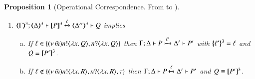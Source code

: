 \documentclass[preprint,11pt]{elsarticle}
\newtheorem{proposition}{Proposition}[section]
\begin{document}
{{\begin{proposition}[Operational Correspondence. From \HOpp to \HOp]
\begin{enumerate}
\begin{enumerate}[a)]
%
%

				\item	If $\ell \notin \set{\news{\tilde{m}} \bactout{n}{\abs{x}{Q}}, \bactinp{n}{\abs{x}{Q}}, \tau}$ then
					$\horel{\tmap{\Gamma}{3}}{\tmap{\Delta}{3}}{\pmap{P}{3}}{\hby{\ell}}
					{\tmap{\Delta'}{3}}{\pmap{P'}{3}}$.

				\item	If $\ell = \btau$ then
					$\horel{\tmap{\Gamma}{3}}{\tmap{\Delta}{3}}{\pmap{P}{3}}{\hby{\tau}}
					{\Delta''}{R}$ and
					$\horel{\tmap{\Gamma}{3}}{\tmap{\Delta'}{3}}{\pmap{P'}{3}}{\hwb}{\Delta''}{R}$, for some $R$.

				\item	If $\ell = \tau$ and $\ell \not= \btau$ then %
					$\horel{\tmap{\Gamma}{3}}{\tmap{\Delta}{3}}{\pmap{P}{3}}{\hby{\tau}}
					{\tmap{\Delta'}{3}}{\pmap{P'}{3}}$.
			\end{enumerate}

		\item	%
			$\horel{\tmap{\Gamma}{3}}{\tmap{\Delta}{3}}{\pmap{P}{3}}{\hby{\ell}}
			{\tmap{\Delta''}{3}}{Q}$ implies
%
			\begin{enumerate}[a)]
				\item	If $\ell \in \{(\nu\, \tilde{m}) n ! \langle \lambda x.\,Q \rangle, n ? \langle \lambda x.\,Q \rangle\}$
					then
					$\Gamma; \Delta \vdash P \xmapsto{\ell'} \Delta' \vdash P'$
					with $\{\!\!\{\ell'\}\!\!\}^{3} = \ell$ and $Q \equiv [\!\![P']\!\!]^3$.

				\item	If $\ell \notin \{(\nu\, \tilde{m}) n ! \langle \lambda x.\,R \rangle, n ? \langle \lambda x.\,R \rangle, \tau\}$
					then
					$\Gamma; \Delta \vdash P \xmapsto{\ell} \Delta' \vdash P'$ and $Q \equiv [\!\![P']\!\!]^3$.


\end{enumerate}
\end{enumerate}
\end{proposition}}}
\end{document}

